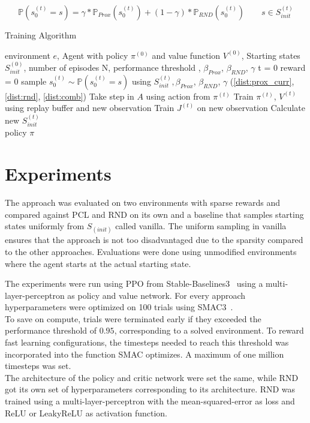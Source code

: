 \documentclass{article}
\begin{document}
\begin{equation}\label{dist:comb}
  \mathbb{P}(s_0^{(t)} = s) = \gamma * \mathbb{P}_{Prox}(s_0^{(t)}) + (1 - \gamma) * \mathbb{P}_{RND}(s_0^{(t)}) \qquad s \in S_{init}^{(t)}
\end{equation}

\begin{algorithm}[H]
    \caption{Training Algorithm}
    \label{alg:code}
    \begin{algorithmic}
      \Require environment $e$, Agent with policy $\pi^{(0)}$ and value function $V^{(0)}$, Starting states $S_{init}^{(0)}$, number of episodes N, performance threshold \eta, $\beta_{Prox}$, $\beta_{RND}$, $\gamma$
        \State t = 0
        \State reward = 0
        \State sample $s_0^{(t)} \sim \mathbb{P}(s_0^{(t)} = s)$ using $S_{init}^{(t)}, \beta_{Prox}$, $\beta_{RND}$, $\gamma$ (\cref{dist:prox_curr}, \cref{dist:rnd}, \cref{dist:comb})
          \State Take step in $A$ using action from $\pi^{(t)}$
          \State Train $\pi^{(t)}$, $V^{(t)}$ using replay buffer and new observation
          \State Train $J^{(t)}$ on new observation
          \State Calculate new $S_{init}^{(t)}$
        \EndWhile \\
        \Return policy $\pi$
    \end{algorithmic}
\end{algorithm}


\section{Experiments}
\label{sec:experiments}
The approach was evaluated on two environments with sparse rewards and compared against PCL and RND on its own and a baseline that samples starting states uniformly from $S_{(init)}$ called vanilla. The uniform sampling in vanilla ensures that the approach is not too disadvantaged due to the sparsity compared to the other approaches. Evaluations were done using unmodified environments where the agent starts at the actual starting state.

The experiments were run using PPO from Stable-Baselines3~\citep{sb3} using a multi-layer-perceptron as policy and value network. For every approach hyperparameters were optimized on 100 trials using SMAC3~\citep{smac}. \\
To save on compute, trials were terminated early if they exceeded the performance threshold of $0.95$, corresponding to a solved environment. To reward fast learning configurations, the timesteps needed to reach this threshold was incorporated into the function SMAC optimizes. A maximum of one million timesteps was set. \\
The architecture of the policy and critic network were set the same, while RND got its own set of hyperparameters corresponding to its architecture. RND was trained using a multi-layer-perceptron with the mean-squared-error as loss and ReLU or LeakyReLU as activation function.
\end{document}
